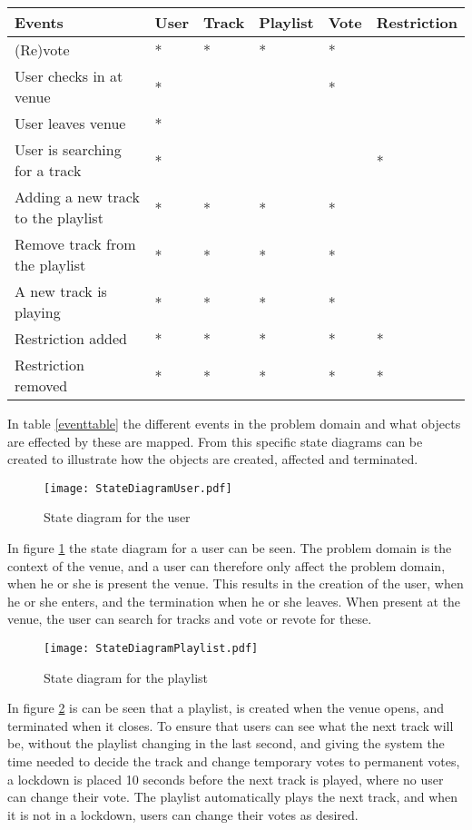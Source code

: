\begin{center}
\label{eventtable}
    \begin{tabular}{|l|l|l|l|l|l|}
    \hline
    \textbf{Events} & User & Track & Playlist & Vote & Restriction \\ \hline
    (Re)vote & * & * & * & * &   \\ \hline
    User checks in at venue & * &   &   & * &   \\ \hline
    User leaves venue & * &   &   &   &   \\ \hline
    User is searching for a track & * &   &   &  & * \\ \hline
    Adding a new track to the playlist & * & * & * & * &   \\ \hline
    Remove track from the playlist & * & * & * & * &   \\ \hline
    A new track is playing & * & * & * & * &   \\ \hline
    Restriction added & * & * & * & * & * \\ \hline
    Restriction removed & * & * & * & * & * \\ \hline
    \end{tabular}
\end{center}

In table \cref{eventtable} the different events in the problem domain and what objects are effected by these are mapped. From this specific state diagrams can be created to illustrate how the objects are created, affected and terminated.

\begin{figure}[H]
  \centering
  \texttt{[image: StateDiagramUser.pdf]}
  \caption{State diagram for the user}\label{fig:StateDiagramUser}
\end{figure}
In figure \cref{fig:StateDiagramUser} the state diagram for a user can be seen. The problem domain is the context of the venue, and a user can therefore only affect the problem domain, when he or she is present the venue. This results in the creation of the user, when he or she enters, and the termination when he or she leaves. When present at the venue, the user can search for tracks and vote or revote for these.

\begin{figure}[H]
  \centering
  \texttt{[image: StateDiagramPlaylist.pdf]}
  \caption{State diagram for the playlist}\label{fig:StateDiagramPlaylist}
\end{figure}
In figure \cref{fig:StateDiagramPlaylist} is can be seen that a playlist, is created when the venue opens, and terminated when it closes. To ensure that users can see what the next track will be, without the playlist changing in the last second, and giving the system the time needed to decide the track and change temporary votes to permanent votes, a lockdown is placed 10 seconds before the next track is played, where no user can change their vote. The playlist automatically plays the next track, and when it is not in a lockdown, users can change their votes as desired.

